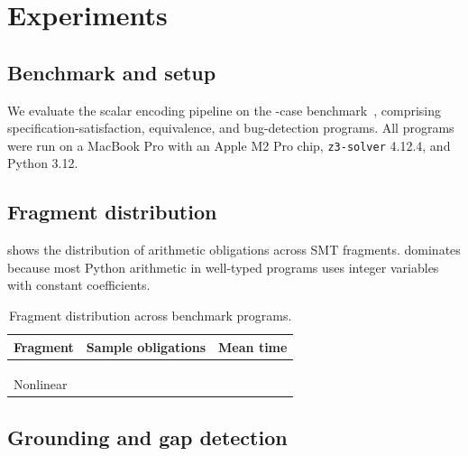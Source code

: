 \documentclass[11pt]{article}
\begin{document}
\section{Experiments}\label{sec:evaluation}

\subsection{Benchmark and setup}

We evaluate the scalar encoding pipeline on the \numcases-case
\JuGeo{} benchmark~\cite{paper10}, comprising \numspec{}
specification-satisfaction, \numeq{} equivalence, and
\numbug{} bug-detection programs.
All programs were run on a MacBook Pro with an Apple M2 Pro
chip, \texttt{z3-solver} 4.12.4, and Python 3.12.

\subsection{Fragment distribution}

 shows the distribution of arithmetic
obligations across SMT fragments.
\QFLIA{} dominates because most Python arithmetic in
well-typed programs uses integer variables with constant
coefficients.

\begin{table}[htbp]
\centering
\caption{Fragment distribution across \numcases{} benchmark programs.}
\label{tab:fragments}
\begin{tabular}{@{}lrr@{}}
\toprule
\textbf{Fragment} & \textbf{Sample obligations} &
  \textbf{Mean time} \\
\midrule
\QFUF{}      & \ppThirteenFragQFUF{} & \ppThirteenQFUFMeanTime{} \\
\QFLIA{}     & \ppThirteenFragQFLIA{} & \ppThirteenQFLIAMeanTime{} \\
\QFBV{}      & \ppThirteenFragQFBV{} & \ppThirteenQFBVMeanTime{} \\
Nonlinear    & \ppThirteenFragNonlinear{} & \ppThirteenNonlinearMeanTime{} \\
\bottomrule
\end{tabular}
\end{table}

\subsection{Grounding and gap detection}
\end{document}
